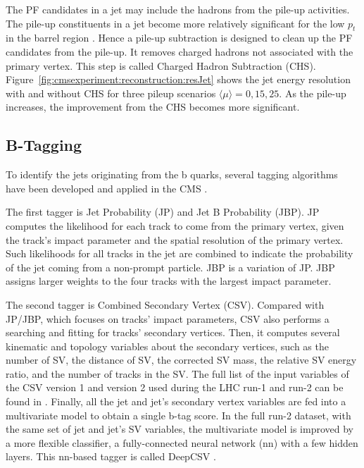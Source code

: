 The PF candidates in a jet may include the hadrons from the pile-up activities. The pile-up constituents in a jet become more relatively significant for the low $p_t$ in the barrel region \cite{cms:particleflow:Sirunyan:2017ulk}. Hence a pile-up subtraction is designed to clean up the PF candidates from the pile-up. It removes charged hadrons not associated with the primary vertex. This step is called Charged Hadron Subtraction (CHS). Figure~\ref{fig:cmsexperiment:reconstruction:resJet} shows the jet energy resolution with and without CHS for three pileup scenarios $\langle \mu\rangle =0,15,25$. As the pile-up increases, the improvement from the CHS becomes more significant.  





\subsection{B-Tagging}

To identify the jets originating from the b quarks, several tagging algorithms have been developed and applied in the CMS \cite{Chatrchyan:2012jua, Sirunyan:2017ezt, Bols:2020bkb}. 

The first tagger is Jet Probability (JP) and Jet B Probability (JBP). JP computes the likelihood for each track to come from the primary vertex, given the track's impact parameter and the spatial resolution of the primary vertex. Such likelihoods for all tracks in the jet are combined to indicate the probability of the jet coming from a non-prompt particle. JBP is a variation of JP. JBP assigns larger weights to the four tracks with the largest impact parameter. 

The second tagger is Combined Secondary Vertex (CSV). Compared with JP/JBP, which focuses on tracks' impact parameters, CSV also performs a searching and fitting for tracks' secondary vertices. Then, it computes several kinematic and topology variables about the secondary vertices, such as the number of SV, the distance of SV, the corrected SV mass, the relative SV energy ratio, and the number of tracks in the SV. The full list of the input variables of the CSV version 1 and version 2 used during the LHC run-1 and run-2 can be found in \cite{Sirunyan:2017ezt}. Finally, all the jet and jet's secondary vertex variables are fed into a multivariate model to obtain a single b-tag score. In the full run-2 dataset, with the same set of jet and jet's SV variables, the multivariate model is improved by a more flexible classifier, a fully-connected neural network (nn) with a few hidden layers. This nn-based tagger is called DeepCSV \cite{Bols:2020bkb}.

